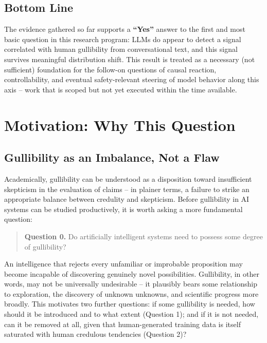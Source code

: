 \documentclass[11pt]{article}
\begin{document}
\subsection*{Bottom Line}

The evidence gathered so far supports a \textbf{``Yes''} answer to the first and most basic question in this research program: LLMs do appear to detect a signal correlated with human gullibility from conversational text, and this signal survives meaningful distribution shift. This result is treated as a necessary (not sufficient) foundation for the follow-on questions of causal reaction, controllability, and eventual safety-relevant steering of model behavior along this axis -- work that is scoped but not yet executed within the time available.

\newpage
\tableofcontents
\newpage

\section{Motivation: Why This Question}

\subsection{Gullibility as an Imbalance, Not a Flaw}

Academically, gullibility can be understood as a disposition toward insufficient skepticism in the evaluation of claims -- in plainer terms, a failure to strike an appropriate balance between credulity and skepticism. Before gullibility in AI systems can be studied productively, it is worth asking a more fundamental question:

\begin{quote}
\textbf{Question 0.} Do artificially intelligent systems need to possess some degree of gullibility?
\end{quote}

An intelligence that rejects every unfamiliar or improbable proposition may become incapable of discovering genuinely novel possibilities. Gullibility, in other words, may not be universally undesirable -- it plausibly bears some relationship to exploration, the discovery of unknown unknowns, and scientific progress more broadly. This motivates two further questions: if some gullibility is needed, how should it be introduced and to what extent (Question 1); and if it is not needed, can it be removed at all, given that human-generated training data is itself saturated with human credulous tendencies (Question 2)?
\end{document}
